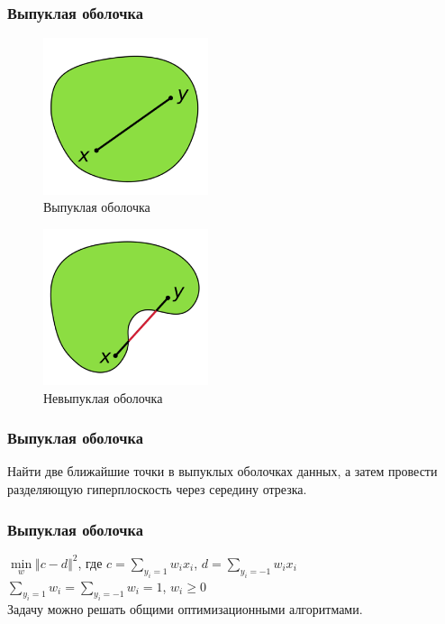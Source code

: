 \documentclass[12pt]{beamer}
\begin{document}
\begin{frame}\frametitle{Выпуклая оболочка}
\begin{figure}[htbp]
	\begin{minipage}{.5\textwidth}
	  \includegraphics[height=130pt, keepaspectratio = true]{images/convex} \\
	  \centering Выпуклая оболочка
    \end{minipage}%
    \begin{minipage}{.5\textwidth}
		\includegraphics[height=130pt, keepaspectratio = true]{images/non-convex}   \\
		\centering Невыпуклая оболочка
	\end{minipage}%
\end{figure}
\end{frame}

\begin{frame}\frametitle{Выпуклая оболочка}
Найти две ближайшие точки в выпуклых
оболочках данных, а затем провести разделяющую
гиперплоскость через середину отрезка.
\end{frame}

\begin{frame}\frametitle{Выпуклая оболочка}
$\min\limits_w \Vert c - d \Vert^2$, где $c = \sum\limits_{y_i = 1} w_ix_i$,  $d = \sum\limits_{y_i = -1} w_ix_i$\\
\vspace{5mm}
$\sum\limits_{y_i = 1}w_i = \sum\limits_{y_i = -1}w_i = 1$, $w_i \geq 0$\\
\vspace{5mm}
Задачу можно решать общими оптимизационными алгоритмами.
\end{frame}
\end{document}
